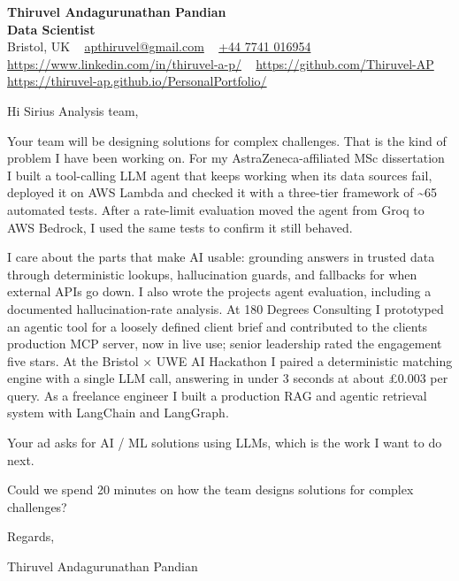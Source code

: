 \documentclass[11pt,a4paper]{article}
\begin{document}
\raggedright
\pagestyle{empty}

\begin{center}
    {\LARGE \color{linkblue} \textbf{Thiruvel Andagurunathan Pandian}}\\[0.2cm]
    {\color{headernavy}\small\textbf{Data Scientist}}\\[0.2cm]
    {\small Bristol, UK\nobreak\ \,\textbar\, \href{mailto:apthiruvel@gmail.com}{apthiruvel@gmail.com}\nobreak\ \,\textbar\, \href{tel:+447741016954}{+44 7741 016954}\nobreak\ \,\textbar\, \href{https://www.linkedin.com/in/thiruvel-a-p/}{https://www.linkedin.com/in/thiruvel-a-p/}\nobreak\ \,\textbar\, \href{https://github.com/Thiruvel-AP}{https://github.com/Thiruvel-AP}\nobreak\ \,\textbar\, \href{https://thiruvel-ap.github.io/PersonalPortfolio/}{https://thiruvel-ap.github.io/PersonalPortfolio/}}

\end{center}

\vspace{0.4cm}

\noindent
Hi Sirius Analysis team,

Your team will be designing solutions for complex challenges. That is the kind of problem I have been working on. For my AstraZeneca-affiliated MSc dissertation I built a tool-calling LLM agent that keeps working when its data sources fail, deployed it on AWS Lambda and checked it with a three-tier framework of \textasciitilde{}65 automated tests. After a rate-limit evaluation moved the agent from Groq to AWS Bedrock, I used the same tests to confirm it still behaved.

I care about the parts that make AI usable: grounding answers in trusted data through deterministic lookups, hallucination guards, and fallbacks for when external APIs go down. I also wrote the project\textquotesingle{}s agent evaluation, including a documented hallucination-rate analysis. At 180 Degrees Consulting I prototyped an agentic tool for a loosely defined client brief and contributed to the client\textquotesingle{}s production MCP server, now in live use; senior leadership rated the engagement five stars. At the Bristol × UWE AI Hackathon I paired a deterministic matching engine with a single LLM call, answering in under 3 seconds at about £0.003 per query. As a freelance engineer I built a production RAG and agentic retrieval system with LangChain and LangGraph.

Your ad asks for AI / ML solutions using LLMs, which is the work I want to do next.

Could we spend 20 minutes on how the team designs solutions for complex challenges?

\vspace{0.5cm}

Regards,

Thiruvel Andagurunathan Pandian
\end{document}
